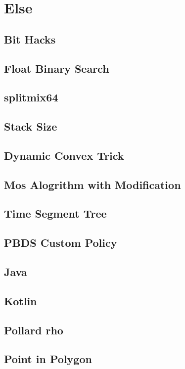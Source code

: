 \section{Else}
\subsection{Bit Hacks}

\subsection{Float Binary Search}

\subsection{splitmix64}

\subsection{Stack Size}

\subsection{Dynamic Convex Trick}

\subsection{Mos Alogrithm with Modification}

\subsection{Time Segment Tree}

\subsection{PBDS Custom Policy}

\subsection{Java}

\subsection{Kotlin}


\newpage
\subsection{Pollard rho}

\subsection{Point in Polygon}

